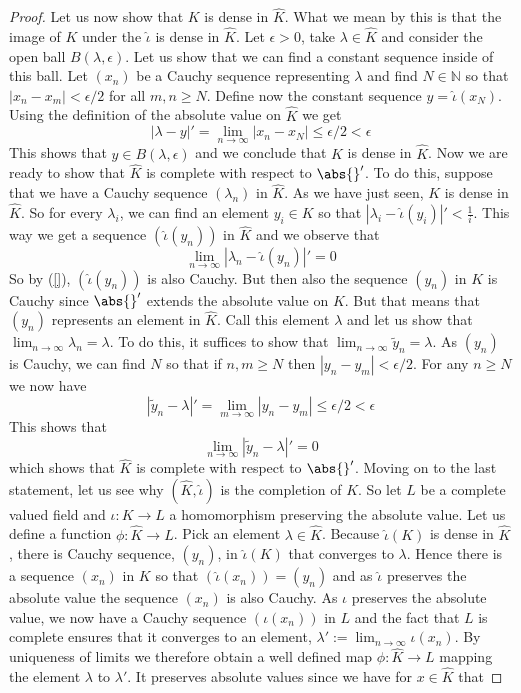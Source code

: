 \documentclass{article}
\newcommand{\mbb}[1]{\mathbb{#1}}
\numberwithin{equation}{section}
\begin{document}
\begin{proof}
    Let us now show that $K$ is dense in $\hat K$. What we mean by this is that the image of $K$ under the $\hat \iota$ is dense in $\hat K$. Let $\epsilon > 0$, take $\lambda \in \hat K$ and consider the open ball $B(\lambda, \epsilon)$. Let us show that we can find a constant sequence inside of this ball. Let $(x_n)$ be a Cauchy sequence representing $\lambda$ and find $N \in \mbb N$ so that $|x_n - x_m| < \epsilon / 2$ for all $m,n \geq N$. Define now the constant sequence $y = \hat \iota (x_N)$. Using the definition of the absolute value on $\hat K$ we get
    $$|\lambda - y|' = \lim_{n \to \infty} |x_n - x_N| \leq \epsilon/2 < \epsilon$$
    This shows that $y \in B(\lambda, \epsilon)$ and we conclude that $K$ is dense in $\hat K$. Now we are ready to show that $\hat K$ is complete with respect to $\abs{}'$. To do this, suppose that we have a Cauchy sequence $(\lambda_n)$ in $\hat K$. As we have just seen, $K$ is dense in $\hat K$. So for every $\lambda_i$, we can find an element $y_i \in K$ so that $|\lambda_i - \hat \iota (y_i)|' < \frac{1}{i}$. This way we get a sequence $(\hat \iota (y_n))$ in $\hat K$ and we observe that
    $$\lim_{n \to \infty} |\lambda_n - \hat \iota(y_n)|' = 0$$
    So by (\ref{}), $(\hat \iota (y_n))$ is also Cauchy. But then also the sequence $(y_n)$ in $K$ is Cauchy since $\abs{}'$ extends the absolute value on $K$. But that means that $(y_n)$ represents an element in $\hat K$. Call this element $\lambda$ and let us show that $\lim_{n \to \infty} \lambda_n = \lambda$. To do this, it suffices to show that $\lim_{n \to \infty} \tilde y_n = \lambda$. As $(y_n)$ is Cauchy, we can find $N$ so that if $n,m \geq N$ then $|y_n - y_m| < \epsilon / 2$. For any $n \geq N$ we now have
    $$|\tilde y_n - \lambda|' = \lim_{m \to \infty} |y_n - y_m| \leq \epsilon / 2 < \epsilon$$
    This shows that
    $$\lim_{n \to \infty} |\tilde y_n - \lambda|' = 0$$
    which shows that $\hat K$ is complete with respect to $\abs{}'$. Moving on to the last statement, let us see why $(\hat K, \hat \iota)$ is the completion of $K$. So let $L$ be a complete valued field and $\iota : K \to L$ a homomorphism preserving the absolute value. Let us define a function $\phi : \hat K \to L$. Pick an element $\lambda \in \hat K$. Because $\hat \iota (K)$ is dense in $\hat K$, there is Cauchy sequence, $(y_n)$, in $\hat \iota (K)$ that converges to $\lambda$. Hence there is a sequence $(x_n)$ in $K$ so that $(\hat \iota(x_n)) = (y_n)$ and as $\hat \iota$ preserves the absolute value the sequence $(x_n)$ is also Cauchy. As $\iota$ preserves the absolute value, we now have a Cauchy sequence $(\iota(x_n))$ in $L$ and the fact that $L$ is complete ensures that it converges to an element, $\lambda' := \lim_{n \to \infty} \iota(x_n)$. By uniqueness of limits we therefore obtain a well defined map $\phi : \hat K \to L$ mapping the element $\lambda$ to $\lambda'$. It preserves absolute values since we have for $x \in \hat K$ that

\end{proof}
\end{document}
